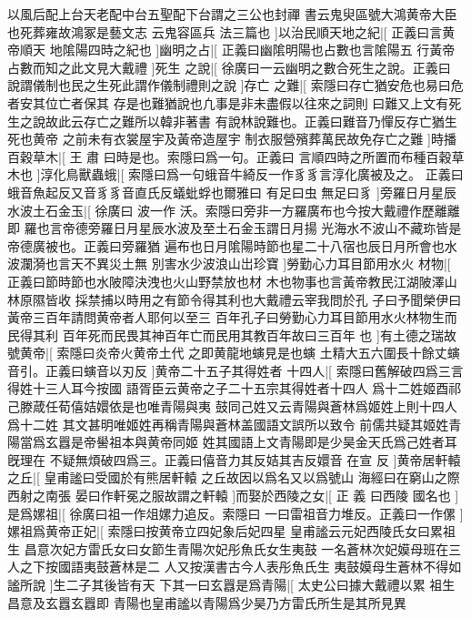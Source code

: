 %
以風后配上台天老配中台五聖配下台謂之三公也封禪%
書云鬼臾區號大鴻黄帝大臣也死葬雍故鴻冢是藝文志%
%
云鬼容區兵%
法三篇也%
]以治民順天地之紀|[%
正義曰言黄帝順天%
地隂陽四時之紀也%
%
]幽明之占|[%
正義曰幽隂明陽也占數也言隂陽五%
行黃帝占數而知之此文見大戴禮%
]死生%
%
之說|[%
徐廣曰一云幽明之數合死生之說。正義曰%
說謂儀制也民之生死此謂作儀制禮則之說%
]存亡%
%
之難|[%
索隱曰存亡猶安危也易曰危者安其位亡者保其%
存是也難猶說也凢事是非未盡假以往來之詞則%
%
曰難又上文有死生之說故此云存亡之難所以韓非著書%
有說林說難也。正義曰難音乃憚反存亡猶生死也黄帝%
%
之前未有衣裳屋宇及黃帝造屋宇%
制衣服營殯葬萬民故免存亡之難%
]時播百穀草木|[%
王%
肅%
%
曰時是也。索隱曰爲一句。正義曰%
言順四時之所置而布種百穀草木也%
]淳化鳥獸蟲蛾|[%
%
索隱曰爲一句蛾音牛綺反一作豸豸言淳化廣被及之。%
正義曰蛾音魚起反又音豸豸音直氏反蟻蚍蜉也爾雅曰%
%
有足曰虫%
無足曰豸%
]旁羅日月星辰水波土石金玉|[%
徐廣曰%
波一作%
%
沃。索隱曰旁非一方羅廣布也今按大戴禮作歷離離即%
羅也言帝德旁羅日月星辰水波及至土石金玉謂日月揚%
%
光海水不波山不藏珎皆是帝德廣被也。正義曰旁羅猶%
遍布也日月隂陽時節也星二十八宿也辰日月所會也水%
%
波瀾漪也言天不異災土無%
別害水少波浪山岀珍寶%
]勞勤心力耳目節用水火%
%
材物|[%
正義曰節時節也水陂障決洩也火山野禁放也材%
木也物事也言黃帝教民江湖陂澤山林原隰皆收%
%
採禁捕以時用之有節令得其利也大戴禮云宰我問於孔%
子曰予聞榮伊曰黃帝三百年請問黄帝者人耶何以至三%
%
百年孔子曰勞勤心力耳目節用水火林物生而民得其利%
百年死而民畏其神百年亡而民用其教百年故曰三百年%
%
也%
]有土德之瑞故號黄帝|[%
索隱曰炎帝火黄帝土代%
之即黄龍地螾見是也螾%
%
土精大五六圍長十餘丈螾%
音引。正義曰螾音以刃反%
]黄帝二十五子其得姓者%
%
十四人|[%
索隱曰舊解破四爲三言得姓十三人耳今按國%
語胥臣云黄帝之子二十五宗其得姓者十四人%
%
爲十二姓姬酉祁己滕葴任荀僖姞嬛依是也唯青陽與夷%
鼓同己姓又云青陽與蒼林爲姬姓上則十四人爲十二姓%
%
其文甚明唯姬姓再稱青陽與蒼林盖國語文誤所以致令%
前儒共疑其姬姓青陽當爲玄囂是帝嚳祖本與黄帝同姬%
%
姓其國語上文青陽即是少昊金天氏爲己姓者耳旣理在%
不疑無煩破四爲三。正義曰僖音力其反姞其吉反嬛音%
%
在宣%
反%
]黄帝居軒轅之丘|[%
皇甫謐曰受國於有熊居軒轅%
之丘故因以爲名又以爲號山%
%
海經曰在窮山之際西射之南張%
晏曰作軒冕之服故謂之軒轅%
]而娶於西陵之女|[%
正%
義%
%
曰西陵%
國名也%
]是爲嫘祖|[%
徐廣曰祖一作俎嫘力追反。索隱曰%
一曰雷祖音力堆反。正義曰一作傫%
%
]嫘祖爲黄帝正妃|[%
索隱曰按黄帝立四妃象后妃四星%
皇甫謐云元妃西陵氏女曰累祖生%
%
昌意次妃方雷氏女曰女節生青陽次妃彤魚氏女生夷鼓%
一名蒼林次妃嫫母班在三人之下按國語夷鼓蒼林是二%
%
人又按漢書古今人表彤魚氏生%
夷鼓嫫母生蒼林不得如謐所說%
]生二子其後皆有天%
%
下其一曰玄囂是爲青陽|[%
太史公曰據大戴禮以累%
祖生昌意及玄囂玄囂即%
%
青陽也皇甫謐以青陽爲少昊乃方雷氏所生是其所見異%
